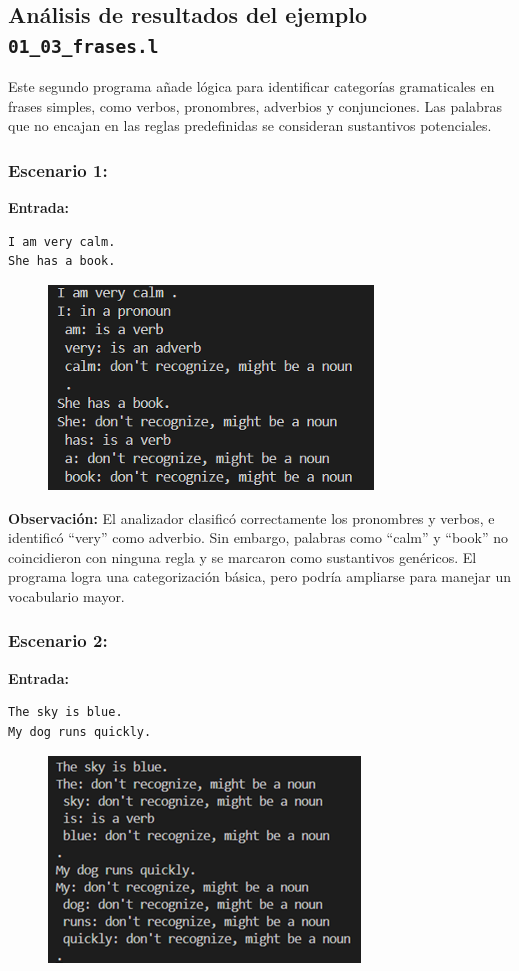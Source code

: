 \documentclass{article}
\begin{document}
\subsection{Análisis de resultados del ejemplo \texttt{01\_03\_frases.l}}

Este segundo programa añade lógica para identificar categorías gramaticales en frases simples, como verbos, pronombres, adverbios y conjunciones. Las palabras que no encajan en las reglas predefinidas se consideran sustantivos potenciales.

\subsubsection{Escenario 1: }

\textbf{Entrada:}  
\begin{verbatim}
I am very calm.
She has a book.
\end{verbatim}

\begin{figure}[H]
    \centering
    \includegraphics[width=0.5\linewidth]{image4.png}
\end{figure}

\textbf{Observación:}  
El analizador clasificó correctamente los pronombres y verbos, e identificó ``very'' como adverbio. Sin embargo, palabras como ``calm'' y ``book'' no coincidieron con ninguna regla y se marcaron como sustantivos genéricos. El programa logra una categorización básica, pero podría ampliarse para manejar un vocabulario mayor.

\subsubsection{Escenario 2: }

\textbf{Entrada:}  
\begin{verbatim}
The sky is blue.
My dog runs quickly.
\end{verbatim}
\begin{figure}[H]
    \centering
    \includegraphics[width=0.5\linewidth]{image5.png}
\end{figure}
\end{document}
